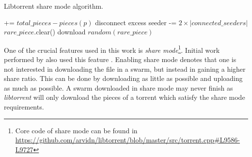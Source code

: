 \begin{algorithm}[h!]
	\caption{Libtorrent share mode algorithm.}
	\label{alg:ltsharemode}
	\begin{algorithmic}[1]
		\Statex \hrulefill {}
		 += {$total\_pieces - pieces(p)$} \label{alg:l_lts:missingp}
		\EndIf	
		\EndFor
		\State disconnect excess seeder \label{alg:l_lts:disconnectpeers}
		\EndIf
		 -= {$2 \times |connected\_seeders|$}	\label{alg:l_lts:reducemissing}	
		  \label{alg:l_lts:retmis}
		\State \Return 
		\EndIf
		 \label{alg:l_lts:retdlenough}
		\State \Return
		\EndIf
		 \label{alg:l_lts:retdling}
		\State \Return
		\EndIf
		\Statex \hrulefill {}
			\label{alg:l_lts:rarepc}
		\State $rare\_piece$.clear()
		\EndIf
		\EndIf	
		\EndFor
		 \label{alg:l_lts:rareunable}
		\State \Return
		\EndIf
		\State download {$random(rare\_piece)$} \label{alg:l_lts:dlrare}
	\end{algorithmic}
\end{algorithm}

One of the crucial features used in this work is \textit{share mode}\footnote{Core code of share mode can be found in \url{https://github.com/arvidn/libtorrent/blob/master/src/torrent.cpp\#L9586-L9727}}. Initial work performed by \citeauthor{2015:creditmining:capota} also used this feature \cite{2015:creditmining:capota}. Enabling share mode denotes that one is not interested in downloading the file in a swarm, but instead in gaining a higher share ratio. This can be done by downloading as little as possible and uploading as much as possible. A swarm downloaded in share mode may never finish as \textit{libtorrent} will only download the pieces of a torrent which satisfy the share mode requirements.

